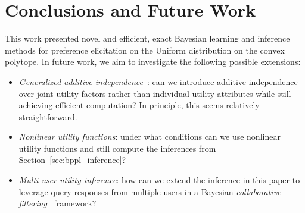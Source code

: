 \documentclass[letterpaper]{article}
\begin{document}
\section{Conclusions and Future Work}

This work presented novel and efficient, exact Bayesian learning and
inference methods for preference elicitation on the Uniform
distribution on the convex polytope.  In future work, we aim to
investigate the following possible extensions:
\begin{itemize}
\item {\it Generalized additive
independence}~\cite{keeney_raiffa76,bacchus_grove}: can we introduce additive
independence over joint utility factors rather than individual utility 
attributes while still achieving efficient computation?  In principle,
this seems relatively straightforward.
\item {\it Nonlinear utility functions}: under what conditions can we
use nonlinear utility functions and still compute the inferences from
Section~\ref{sec:bppl_inference}?
\item {\it Multi-user utility inference}: how can we extend the
inference in this paper to leverage query responses from multiple
users in a Bayesian \emph{collaborative filtering}~\cite{collab_filtering} 
framework?
\end{itemize}

%



\end{document}
